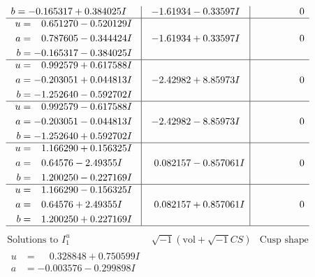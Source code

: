 \documentclass[1p]{elsarticle_modified}
\theoremstyle{definition}
\newcommand{\I}{\sqrt{-1}}
\begin{document}
$$\begin{array}{c|c|c}
\begin{aligned}
b &= -0.165317 + 0.384025 I\end{aligned}
 & -1.61934 - 0.33597 I & \phantom{-0.000000 } 0 \\ \hline\begin{aligned}
u &= \phantom{-}0.651270 - 0.520129 I \\
a &= \phantom{-}0.787605 - 0.344424 I \\
b &= -0.165317 - 0.384025 I\end{aligned}
 & -1.61934 + 0.33597 I & \phantom{-0.000000 } 0 \\ \hline\begin{aligned}
u &= \phantom{-}0.992579 + 0.617588 I \\
a &= -0.203051 + 0.044813 I \\
b &= -1.252640 - 0.592702 I\end{aligned}
 & -2.42982 + 8.85973 I & \phantom{-0.000000 } 0 \\ \hline\begin{aligned}
u &= \phantom{-}0.992579 - 0.617588 I \\
a &= -0.203051 - 0.044813 I \\
b &= -1.252640 + 0.592702 I\end{aligned}
 & -2.42982 - 8.85973 I & \phantom{-0.000000 } 0 \\ \hline\begin{aligned}
u &= \phantom{-}1.166290 + 0.156325 I \\
a &= \phantom{-}0.64576 - 2.49355 I \\
b &= \phantom{-}1.200250 - 0.227169 I\end{aligned}
 & \phantom{-}0.082157 - 0.857061 I & \phantom{-0.000000 } 0 \\ \hline\begin{aligned}
u &= \phantom{-}1.166290 - 0.156325 I \\
a &= \phantom{-}0.64576 + 2.49355 I \\
b &= \phantom{-}1.200250 + 0.227169 I\end{aligned}
 & \phantom{-}0.082157 + 0.857061 I & \phantom{-0.000000 } 0\\
 \hline 
 \end{array}$$\newpage$$\begin{array}{c|c|c}  
\text{Solutions to }I^u_{1}& \I (\text{vol} + \sqrt{-1}CS) & \text{Cusp shape}\\
 \hline 
\begin{aligned}
u &= \phantom{-}0.328848 + 0.750599 I \\
a &= -0.003576 - 0.299898 I \\

\end{aligned}
\end{array}$$
\end{document}
